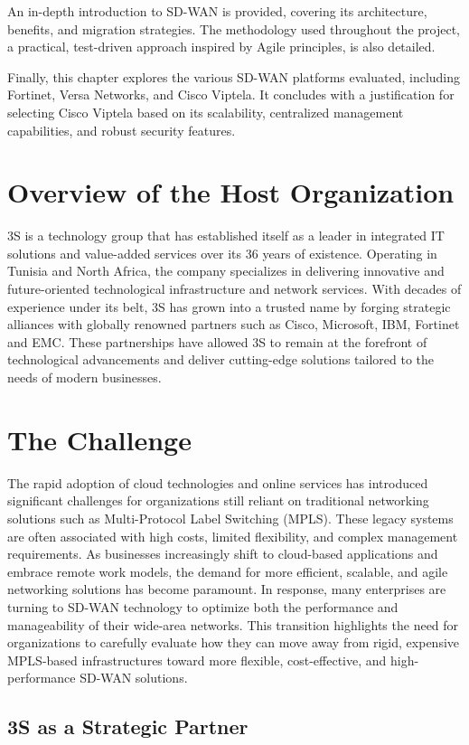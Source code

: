 \documentclass[12pt,english]{report}
\begin{document}
An in-depth introduction to SD-WAN is provided, covering its architecture, benefits, and migration strategies. The methodology used throughout the project, a practical, test-driven approach inspired by Agile principles, is also detailed.

Finally, this chapter explores the various SD-WAN platforms evaluated, including Fortinet, Versa Networks, and Cisco Viptela. It concludes with a justification for selecting Cisco Viptela based on its scalability, centralized management capabilities, and robust security features. 
\section{Overview of the Host Organization}
3S is a technology group that has established itself as a leader in integrated IT solutions and value-added services over its 36 years of existence. Operating in Tunisia and North Africa, the company specializes in delivering innovative and future-oriented technological infrastructure and network services. With decades of experience under its belt, 3S has grown into a trusted name by forging strategic alliances with globally renowned partners such as Cisco, Microsoft, IBM, Fortinet and EMC. These partnerships have allowed 3S to remain at the forefront of technological advancements and deliver cutting-edge solutions tailored to the needs of modern businesses\cite{ref1}.
\section{The Challenge}
The rapid adoption of cloud technologies and online services has introduced significant challenges for organizations still reliant on traditional networking solutions such as Multi-Protocol Label Switching (MPLS). These legacy systems are often associated with high costs, limited flexibility, and complex management requirements. As businesses increasingly shift to cloud-based applications and embrace remote work models, the demand for more efficient, scalable, and agile networking solutions has become paramount. In response, many enterprises are turning to SD-WAN technology to optimize both the performance and manageability of their wide-area networks. This transition highlights the need for organizations to carefully evaluate how they can move away from rigid, expensive MPLS-based infrastructures toward more flexible, cost-effective, and high-performance SD-WAN solutions\cite{ref2}.

\subsection{3S as a Strategic Partner}
\end{document}
